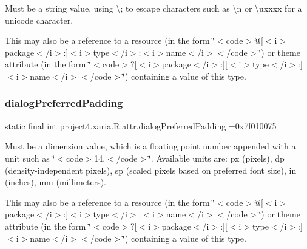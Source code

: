 Must be a string value, using \textquotesingle{}\textbackslash{};\textquotesingle{} to escape characters such as \textquotesingle{}\textbackslash{}n\textquotesingle{} or \textquotesingle{}\textbackslash{}uxxxx\textquotesingle{} for a unicode character. 

This may also be a reference to a resource (in the form \char`\"{}$<$code$>$@\mbox{[}$<$i$>$package$<$/i$>$\+:\mbox{]}$<$i$>$type$<$/i$>$\+:$<$i$>$name$<$/i$>$$<$/code$>$\char`\"{}) or theme attribute (in the form \char`\"{}$<$code$>$?\mbox{[}$<$i$>$package$<$/i$>$\+:\mbox{]}\mbox{[}$<$i$>$type$<$/i$>$\+:\mbox{]}$<$i$>$name$<$/i$>$$<$/code$>$\char`\"{}) containing a value of this type. \mbox{\label{classproject4_1_1xaria_1_1R_1_1attr_aad7863e1d64f1721a733f75862b6b91b}} 
\subsubsection{\texorpdfstring{dialog\+Preferred\+Padding}{dialogPreferredPadding}}
{\footnotesize\ttfamily static final int project4.\+xaria.\+R.\+attr.\+dialog\+Preferred\+Padding =0x7f010075\hspace{0.3cm}{\ttfamily [static]}}

Must be a dimension value, which is a floating point number appended with a unit such as \char`\"{}$<$code$>$14.\+5sp$<$/code$>$\char`\"{}. Available units are\+: px (pixels), dp (density-\/independent pixels), sp (scaled pixels based on preferred font size), in (inches), mm (millimeters). 

This may also be a reference to a resource (in the form \char`\"{}$<$code$>$@\mbox{[}$<$i$>$package$<$/i$>$\+:\mbox{]}$<$i$>$type$<$/i$>$\+:$<$i$>$name$<$/i$>$$<$/code$>$\char`\"{}) or theme attribute (in the form \char`\"{}$<$code$>$?\mbox{[}$<$i$>$package$<$/i$>$\+:\mbox{]}\mbox{[}$<$i$>$type$<$/i$>$\+:\mbox{]}$<$i$>$name$<$/i$>$$<$/code$>$\char`\"{}) containing a value of this type. \mbox{\label{classproject4_1_1xaria_1_1R_1_1attr_ad2cbff1c880b3d8ab32154dd28810dfa}} 
